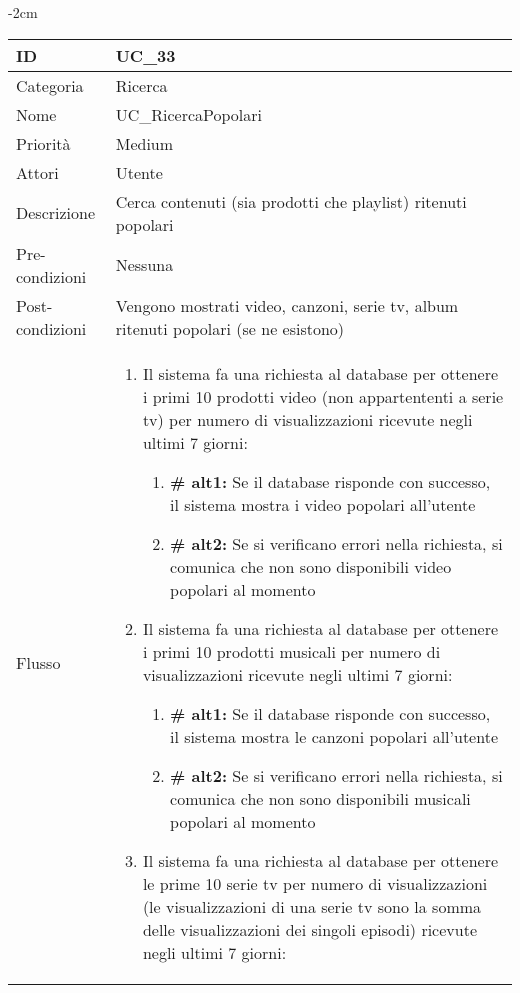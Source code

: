 \begin{center}
\begin{table}[bp]
    \centering
    \addtolength{\leftskip} {-2cm}
\begin{tabular}{ |p{2.6cm}|p{13cm}|  }
\hline
ID & UC\_33 \\\hline
Categoria & Ricerca \\\hline
Nome & UC\_RicercaPopolari\\\hline
Priorità & Medium \\\hline
Attori &  Utente \\\hline
Descrizione & Cerca contenuti (sia prodotti che playlist) ritenuti popolari\\\hline
Pre-condizioni & Nessuna\\\hline
Post-condizioni &  Vengono mostrati video, canzoni, serie tv, album ritenuti popolari (se ne esistono)\\\hline
Flusso &  	\vspace{-5mm} \begin{enumerate}
		\item Il sistema fa una richiesta al database per ottenere i primi 10 prodotti video (non appartententi a serie tv) per numero di visualizzazioni ricevute negli ultimi 7 giorni:
				\begin{enumerate}[label*=\arabic*.]
					\item \textbf{\# alt1:} Se il database risponde con successo, il sistema mostra i video popolari all'utente
					\item \textbf{\# alt2:} Se si verificano errori nella richiesta, si comunica che non sono disponibili video popolari al momento
				\end{enumerate}
		\item Il sistema fa una richiesta al database per ottenere i primi 10 prodotti musicali per numero di visualizzazioni ricevute negli ultimi 7 giorni:
				\begin{enumerate}[label*=\arabic*.]
					\item \textbf{\# alt1:} Se il database risponde con successo, il sistema mostra le canzoni popolari all'utente
					\item \textbf{\# alt2:} Se si verificano errori nella richiesta, si comunica che non sono disponibili musicali popolari al momento
				\end{enumerate}
		\item Il sistema fa una richiesta al database per ottenere le prime 10 serie tv per numero di visualizzazioni (le visualizzazioni di una serie tv sono la somma delle visualizzazioni dei singoli episodi) ricevute negli ultimi 7 giorni:

\end{enumerate}
\end{tabular}
\end{table}
\end{center}
